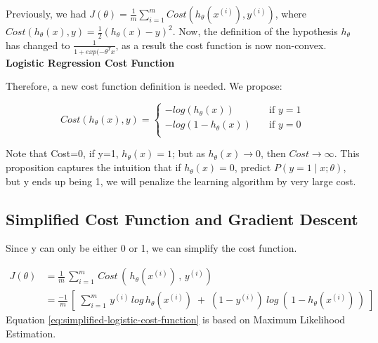         Previously, we had $ J(\theta) = \frac{1}{m} \sum_{i=1}^{m} Cost( h_\theta ( x^{(i)}), y^{(i)} )$, where $Cost (h_\theta(x), y) = \frac{1}{2} (h_\theta(x) - y)^2$. 
        Now, the definition of the hypothesis $h_\theta$ has changed to $\frac{1}{1+exp(-\theta^T x}$, as a result the cost function is now non-convex. \\ 
        
            \textbf{Logistic Regression Cost Function}

            Therefore, a new cost function definition is needed. We propose: 

            \[
                Cost (h_\theta(x), y) = 
                \begin{cases}
                    -log(h_\theta(x))       &\quad \text{if } y=1 \\
                    -log(1- h_\theta(x))    &\quad \text{if } y=0 \\
                \end{cases}
            \] 

            Note that Cost=0, if y=1, $h_\theta(x) =1$; but as $h_\theta(x) \to 0$, then $Cost \to \infty$. This proposition captures the intuition that if $h_\theta(x)=0$, predict $P(y=1 \mid x;\theta)$, but y ends up being 1, we will penalize the learning algorithm by very large cost.
            
    \subsection{Simplified Cost Function and Gradient Descent}
        

            Since y can only be either 0 or 1, we can simplify the cost function.
       

            \begin{equation}
                \begin{split}
                    J(\theta)   &= \frac{1}{m}\, \sum_{i=1}^{m}\, Cost\,(\, h_\theta ( x^{(i)})\, ,\, y^{(i)} ) \\
                    &= \frac{-1}{m} \, [ \; \sum_{i=1}^{m}\, y^{(i)}\, log\, h_\theta (x^{(i)})\; +\; (1-y^{(i)})\: log\:(\,1-h_\theta(x^{(i)})\,) \;] 
                \end{split}
                \label{eq:simplified-logistic-cost-function}
            \end{equation}
            Equation \ref{eq:simplified-logistic-cost-function} is based on Maximum Likelihood Estimation.


